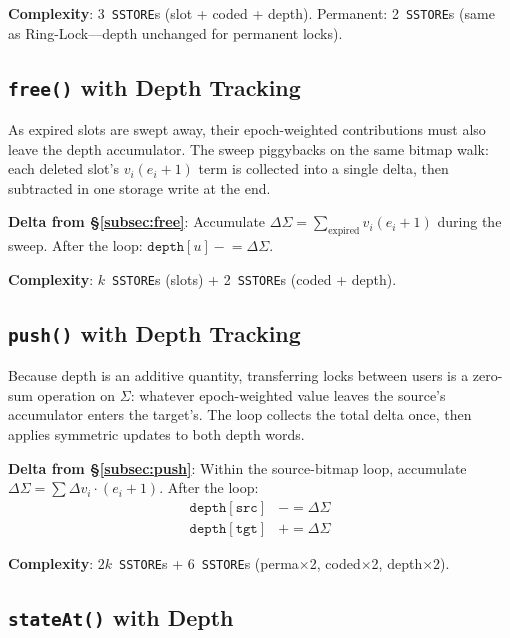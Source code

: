 \documentclass[10pt,a4paper,twocolumn]{article}
\theoremstyle{definition}
\theoremstyle{plain}
\theoremstyle{remark}
\begin{document}
\textbf{Complexity}: 3~\texttt{SSTORE}s (slot + coded + depth). Permanent: 2~\texttt{SSTORE}s (same as Ring-Lock---depth unchanged for permanent locks).

\subsection{\texttt{free()} with Depth Tracking}
\label{subsec:free-depth}

As expired slots are swept away, their epoch-weighted contributions must also leave the depth accumulator.  The sweep piggybacks on the same bitmap walk: each deleted slot's $v_i(e_i{+}1)$ term is collected into a single delta, then subtracted in one storage write at the end.

\textbf{Delta from \S\ref{subsec:free}}: Accumulate $\Delta\Sigma = \sum_{\text{expired}} v_i(e_i{+}1)$ during the sweep. After the loop: $\texttt{depth}[u] \mathrel{-}= \Delta\Sigma$.

\textbf{Complexity}: $k$~\texttt{SSTORE}s (slots) + 2~\texttt{SSTORE}s (coded + depth).

\subsection{\texttt{push()} with Depth Tracking}
\label{subsec:push-depth}

Because depth is an additive quantity, transferring locks between users is a zero-sum operation on $\Sigma$: whatever epoch-weighted value leaves the source's accumulator enters the target's.  The loop collects the total delta once, then applies symmetric updates to both depth words.

\textbf{Delta from \S\ref{subsec:push}}: Within the source-bitmap loop, accumulate $\Delta\Sigma = \sum \Delta v_i \cdot (e_i{+}1)$. After the loop:
\begin{align*}
\texttt{depth}[\texttt{src}] &\mathrel{-}= \Delta\Sigma \\
\texttt{depth}[\texttt{tgt}] &\mathrel{+}= \Delta\Sigma
\end{align*}

\textbf{Complexity}: $2k$~\texttt{SSTORE}s + 6~\texttt{SSTORE}s (perma$\times$2, coded$\times$2, depth$\times$2).

\subsection{\texttt{stateAt()} with Depth}
\label{subsec:stateat-depth}
\end{document}
